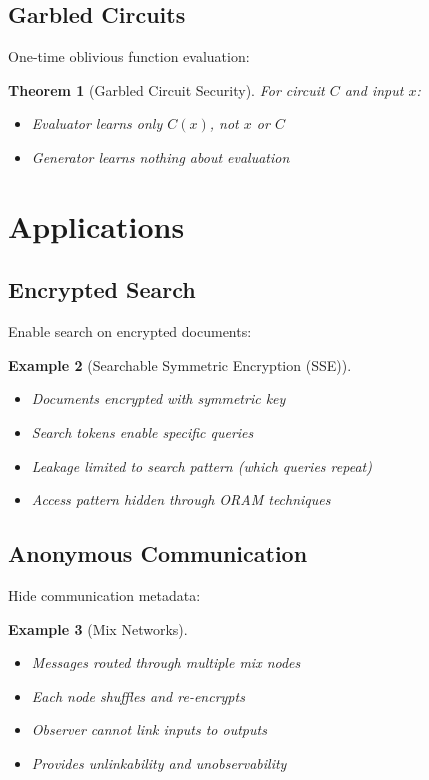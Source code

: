 \documentclass[11pt,final,hidelinks]{article}
\newtheorem{theorem}{Theorem}[section]
\newtheorem{example}[theorem]{Example}
\begin{document}
\subsection{Garbled Circuits}

One-time oblivious function evaluation:

\begin{theorem}[Garbled Circuit Security]
For circuit $C$ and input $x$:
\begin{itemize}
    \item Evaluator learns only $C(x)$, not $x$ or $C$
    \item Generator learns nothing about evaluation
\end{itemize}
\end{theorem}

\section{Applications}

\subsection{Encrypted Search}

Enable search on encrypted documents:

\begin{example}[Searchable Symmetric Encryption (SSE)]
\begin{itemize}
    \item Documents encrypted with symmetric key
    \item Search tokens enable specific queries
    \item Leakage limited to search pattern (which queries repeat)
    \item Access pattern hidden through ORAM techniques
\end{itemize}
\end{example}

\subsection{Anonymous Communication}

Hide communication metadata:

\begin{example}[Mix Networks]
\begin{itemize}
    \item Messages routed through multiple mix nodes
    \item Each node shuffles and re-encrypts
    \item Observer cannot link inputs to outputs
    \item Provides unlinkability and unobservability
\end{itemize}
\end{example}
\end{document}
